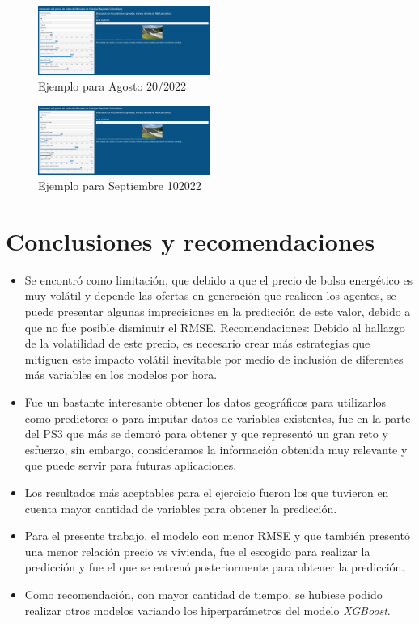 \documentclass[conference, 10pt]{IEEEtran}
\begin{document}
\begin{figure}[htbp]
\centerline{\includegraphics[width=0.5\textwidth]{../Images/AppWeb1.png}}
\caption{Ejemplo para Agosto 20/2022}
\label{fig_4}
\end{figure}


\begin{figure}[htbp]
\centerline{\includegraphics[width=0.5\textwidth]{../Images/AppWeb2.png}}
\caption{Ejemplo para Septiembre 10\/2022}
\label{fig_5}
\end{figure}



\section{Conclusiones y recomendaciones}
\begin{itemize}
\item Se encontró como limitación, que debido  a que el precio de bolsa energético es muy volátil y depende las ofertas en generación que realicen los agentes, se puede presentar algunas imprecisiones en la predicción de este valor, debido a que no fue posible disminuir el RMSE. 
Recomendaciones: Debido al hallazgo de la volatilidad de este precio, es necesario crear más estrategias que mitiguen este impacto volátil inevitable por medio de inclusión de diferentes más variables en los modelos por hora.

\item Fue un bastante interesante obtener los datos geográficos para utilizarlos como predictores o para imputar datos de variables existentes, fue en la parte del PS3 que más se demoró para obtener y que representó un gran reto y esfuerzo, sin embargo, consideramos la información obtenida muy relevante y que puede servir para futuras aplicaciones.
\item Los resultados más aceptables para el ejercicio fueron los que tuvieron en cuenta mayor cantidad de variables para obtener la predicción.
\item Para el presente trabajo, el modelo con menor RMSE y que también presentó una menor relación precio vs vivienda, fue el escogido para realizar la predicción y fue el que se entrenó posteriormente para obtener la predicción.
\item Como recomendación, con mayor cantidad de tiempo, se hubiese podido realizar otros modelos variando los hiperparámetros del modelo \textit{XGBoost}. 

\end{itemize}
\end{document}
